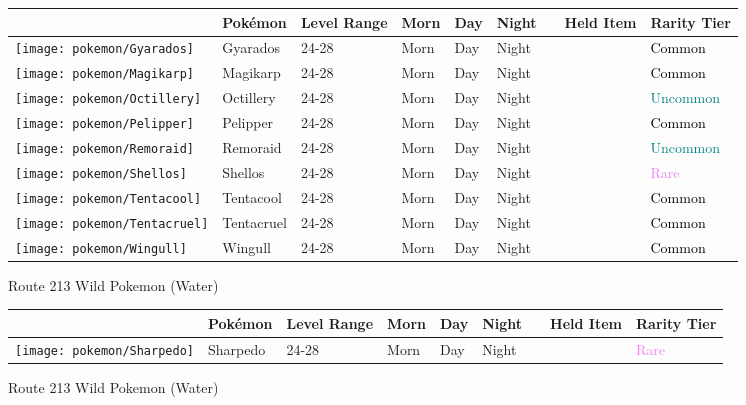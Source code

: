 \begin{longtable}{||l l l l l l l l l||}%
\hline%
&Pokémon&Level Range&Morn&Day&Night&&Held Item&Rarity Tier\\%
\hline%
\endhead%
\hline%
\texttt{[image: pokemon/Gyarados]}&Gyarados&24{-}28&Morn&Day&Night&&&\textcolor{black}{%
Common%
}\\%
\hline%
\texttt{[image: pokemon/Magikarp]}&Magikarp&24{-}28&Morn&Day&Night&&&\textcolor{black}{%
Common%
}\\%
\hline%
\texttt{[image: pokemon/Octillery]}&Octillery&24{-}28&Morn&Day&Night&&&\textcolor{teal}{%
Uncommon%
}\\%
\hline%
\texttt{[image: pokemon/Pelipper]}&Pelipper&24{-}28&Morn&Day&Night&&&\textcolor{black}{%
Common%
}\\%
\hline%
\texttt{[image: pokemon/Remoraid]}&Remoraid&24{-}28&Morn&Day&Night&&&\textcolor{teal}{%
Uncommon%
}\\%
\hline%
\texttt{[image: pokemon/Shellos]}&Shellos&24{-}28&Morn&Day&Night&&&\textcolor{violet}{%
Rare%
}\\%
\hline%
\texttt{[image: pokemon/Tentacool]}&Tentacool&24{-}28&Morn&Day&Night&&&\textcolor{black}{%
Common%
}\\%
\hline%
\texttt{[image: pokemon/Tentacruel]}&Tentacruel&24{-}28&Morn&Day&Night&&&\textcolor{black}{%
Common%
}\\%
\hline%
\texttt{[image: pokemon/Wingull]}&Wingull&24{-}28&Morn&Day&Night&&&\textcolor{black}{%
Common%
}\\%
\hline%
\end{longtable}%
\caption{Route 213 Wild Pokemon (Water)}%
\begin{longtable}{||l l l l l l l l l||}%
\hline%
&Pokémon&Level Range&Morn&Day&Night&&Held Item&Rarity Tier\\%
\hline%
\endhead%
\hline%
\texttt{[image: pokemon/Sharpedo]}&Sharpedo&24{-}28&Morn&Day&Night&&&\textcolor{violet}{%
Rare%
}\\%
\hline%
\end{longtable}%
\caption{Route 213 Wild Pokemon (Water)}